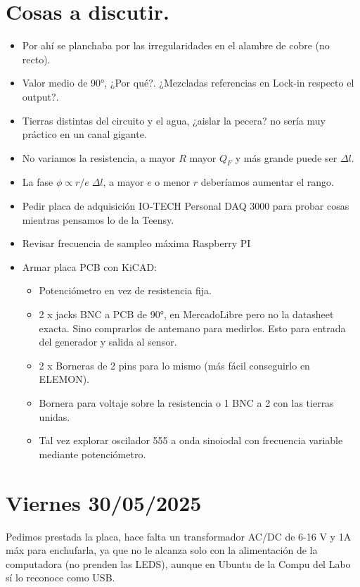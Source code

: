 
\section*{Cosas a discutir.}

\begin{itemize}
	\item Por ahí se planchaba por las irregularidades en el alambre de cobre (no recto).
	\item Valor medio de 90°, ¿Por qué?. ¿Mezcladas referencias en Lock-in respecto el output?. 
	\item Tierras distintas del circuito y el agua, ¿aislar la pecera? no sería muy práctico en un canal gigante. 
	\item No variamos la resistencia, a mayor $R$ mayor $Q_F$ y más grande puede ser $\Delta l$. 
	\item La fase $\phi \propto r/e\;\Delta l$, a mayor $e$ o menor $r$ deberíamos aumentar el rango.
	\item Pedir placa de adquisición IO-TECH Personal DAQ 3000 para probar cosas mientras pensamos lo de la Teensy.
	\item Revisar frecuencia de sampleo máxima Raspberry PI
	\item Armar placa PCB con KiCAD:
	
	\begin{itemize}
		\item Potenciómetro en vez de resistencia fija.
		\item 2 x jacks BNC a PCB de 90°, en MercadoLibre pero no la datasheet exacta. Sino comprarlos de antemano para medirlos. Esto para entrada del generador y salida al sensor.
		\item 2 x Borneras de 2 pins para lo mismo (más fácil conseguirlo en ELEMON).
		\item Bornera para voltaje sobre la resistencia o 1 BNC a 2 con las tierras unidas.
		\item Tal vez explorar oscilador 555 a onda sinoiodal con frecuencia variable mediante potenciómetro. 
	\end{itemize}
\end{itemize}


\section{Viernes 30/05/2025} %

Pedimos prestada la placa, hace falta un transformador AC/DC de 6-16 V y 1A máx para enchufarla, ya que no le alcanza solo con la alimentación de la computadora (no prenden las LEDS), aunque en Ubuntu de la Compu del Labo sí lo reconoce como USB.




